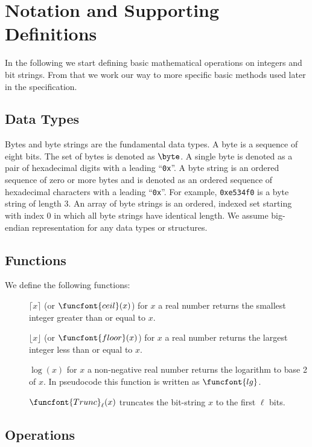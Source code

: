  
\section{Notation and Supporting Definitions}
\label{sec:notation}


In the following we start defining basic mathematical operations on integers and bit strings. From that we work our way to more specific basic methods used later in the specification.

\subsection{Data Types}

Bytes and byte strings are the fundamental data types. A byte is a sequence of eight bits. The set of bytes is denoted as $\byte$. A single byte is denoted as a pair of hexadecimal digits with a leading ``\texttt{0x}''. A byte string is an ordered sequence of zero or more bytes and is denoted as an ordered sequence of hexadecimal characters with a leading ``\texttt{0x}''. For example, \texttt{0xe534f0} is a byte string of length 3. An array of byte strings is an ordered, indexed set starting with index 0 in which all byte strings have identical length. We assume big-endian representation for any data types or structures.

\subsection{Functions}

We define the following functions:
\begin{description}
    \item[]$\lceil x \rceil$ (or $\funcfont{ceil}(x)$) for $x$ a real number returns the smallest integer greater than or equal to $x$.
    \item[]$\lfloor x \rfloor$ (or $\funcfont{floor}(x)$) for $x$ a real number returns the largest integer less than or equal to $x$.
    \item[]$\log(x)$ for $x$ a non-negative real number returns the logarithm to base 2 of $x$. In pseudocode this function is written as $\funcfont{lg}$.
    \item[]$\funcfont{Trunc}_\ell(x)$ truncates the bit-string $x$ to the first $\ell$ bits.
\end{description}

\subsection{Operations}

